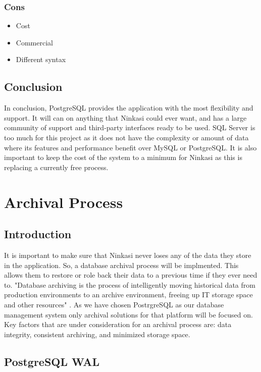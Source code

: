 \documentclass[draftclsnofoot,onecolumn,journal,letterpaper,compsoc,10pt]{IEEEtran}
\begin{document}
        \subsubsection{Cons}
        \begin{itemize}
            \item Cost
            \item Commercial
            \item Different syntax
        \end{itemize}
    
    \subsection{Conclusion}

    In conclusion, PostgreSQL provides the application with the most flexibility and support.  It will can on anything that Ninkasi could ever want, and has a large community of support and third-party interfaces ready to be used.  SQL Server is too much for this project as it does not have the complexity or amount of data where its features and performance benefit over MySQL or PostgreSQL.  It is also important to keep the cost of the system to a minimum for Ninkasi as this is replacing a currently free process.

\section{Archival Process}

    \subsection{Introduction}
    
    It is important to make sure that Ninkasi never loses any of the data they store in the application.  So, a database archival process will be implmented.  This allows them to restore or role back their data to a previous time if they ever need to.  "Database archiving is the process of intelligently moving historical data from production environments to an archive environment, freeing up IT storage space and other resources" \cite{ibm_archiving}.  As we have chosen PostrgreSQL as our database management system only archival solutions for that platform will be focused on.  Key factors that are under consideration for an archival process are: data integrity, consistent archiving, and minimized storage space.
    
    \subsection{PostgreSQL WAL}
    
\end{document}
